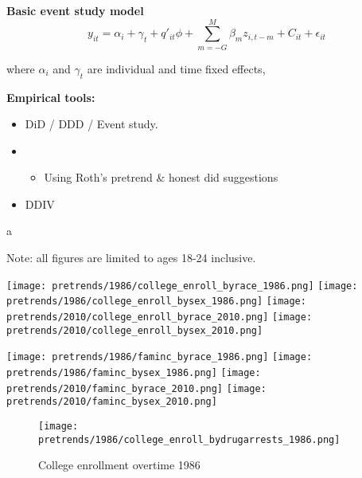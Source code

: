 \documentclass{article}
\begin{document}
\textbf{Basic event study model}
\begin{equation} \label{eq:1}
  y_{it} = \alpha_i + \gamma_t + q'_{it} \phi + \sum_{m=-G}^{M} \beta_m z_{i,t-m} + C_{it} +\epsilon_{it}
\end{equation}

where $\alpha_i$ and $\gamma_t$ are individual and time fixed effects, 

\textbf{Empirical tools:}
\begin{itemize}[itemsep=0.05mm, parsep=0pt]
  \item DiD / DDD / Event study.
  \item \begin{itemize}
    \item Using Roth's pretrend \& honest did suggestions
  \end{itemize}
  \item DDIV
\end{itemize}


\clearpage
\nocite{*}
\singlespacing



a
\clearpage

Note: all figures are limited to ages 18-24 inclusive.

\begin{center}
  \texttt{[image: pretrends/1986/college\_enroll\_byrace\_1986.png]}
  \texttt{[image: pretrends/1986/college\_enroll\_bysex\_1986.png]}
  \texttt{[image: pretrends/2010/college\_enroll\_byrace\_2010.png]}
  \texttt{[image: pretrends/2010/college\_enroll\_bysex\_2010.png]}
\end{center}

\clearpage

\begin{center}
  \texttt{[image: pretrends/1986/faminc\_byrace\_1986.png]}
  \texttt{[image: pretrends/1986/faminc\_bysex\_1986.png]}
  \texttt{[image: pretrends/2010/faminc\_byrace\_2010.png]}
  \texttt{[image: pretrends/2010/faminc\_bysex\_2010.png]}
\end{center}

\clearpage

\begin{figure}[h]
  \caption{College enrollment overtime 1986}
  \centering
  \texttt{[image: pretrends/1986/college\_enroll\_bydrugarrests\_1986.png]}
  \label{fig:TBD}
\end{figure}
\end{document}
